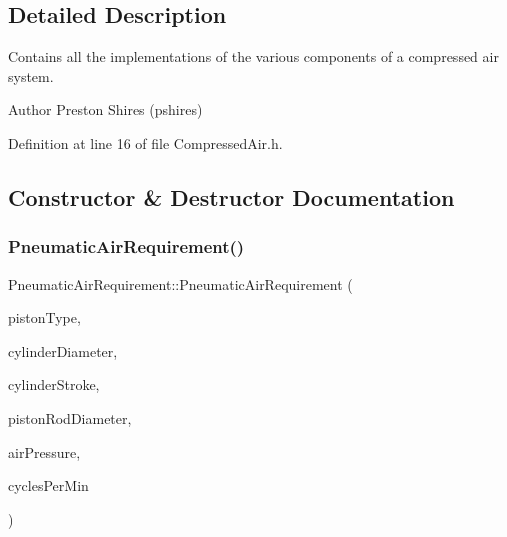 \subsection{Detailed Description}
Contains all the implementations of the various components of a compressed air system. 

\begin{DoxyAuthor}{Author}
Preston Shires (pshires) 
\end{DoxyAuthor}


Definition at line 16 of file Compressed\+Air.\+h.



\subsection{Constructor \& Destructor Documentation}
\mbox{\label{class_pneumatic_air_requirement_a1255612b8467e69471c097c94eabcf69}} 
\subsubsection{\texorpdfstring{Pneumatic\+Air\+Requirement()}{PneumaticAirRequirement()}\hspace{0.1cm}{\footnotesize\ttfamily [1/2]}}
{\footnotesize\ttfamily Pneumatic\+Air\+Requirement\+::\+Pneumatic\+Air\+Requirement (\begin{DoxyParamCaption}\item[{Piston\+Type}]{piston\+Type,  }\item[{double}]{cylinder\+Diameter,  }\item[{double}]{cylinder\+Stroke,  }\item[{double}]{piston\+Rod\+Diameter,  }\item[{double}]{air\+Pressure,  }\item[{double}]{cycles\+Per\+Min }\end{DoxyParamCaption})}

